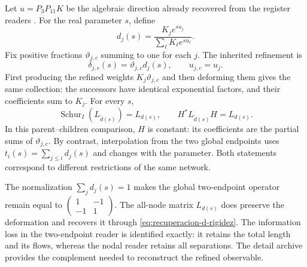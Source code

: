 Let \(u=P_3P_{11}K\) be the algebraic direction already recovered
from the register readers \cite{hmtX}. For the real parameter \(s\),
define
\[
 d_j(s)=\frac{K_je^{su_j}}{\sum_\ell K_\ell e^{su_\ell}}.
\]
Fix positive fractions \(\vartheta_{j,c}\) summing to one for each
\(j\). The inherited refinement is
\[
 \delta_{j,c}(s)=\vartheta_{j,c}d_j(s),\qquad
 u_{j,c}=u_j.
\]
First producing the refined weights \(K_j\vartheta_{j,c}\) and
then deforming them gives the same collection: the successors have identical
exponential factors, and their coefficients sum to \(K_j\).
For every \(s\),
\begin{equation}
 \operatorname{Schur}_{I}(L_{\widetilde d(s)})=L_{d(s)},
 \qquad H^*L_{\widetilde d(s)}H=L_{d(s)}.
 \label{eq:schur-flujo-k}
\end{equation}
In this parent--children comparison, \(H\) is constant: its
coefficients are the partial sums of \(\vartheta_{j,c}\).
By contrast, interpolation from the two global endpoints uses
\(t_i(s)=\sum_{j\le i}d_j(s)\) and changes with the parameter.
Both statements correspond to different restrictions of the same network.

The normalization \(\sum_jd_j(s)=1\) makes the global two-endpoint
operator remain equal to
\(\left(\begin{smallmatrix}1&-1\\-1&1\end{smallmatrix}\right)\).
The all-node matrix \(L_{d(s)}\) does preserve the deformation and
recovers it through \eqref{eq:recuperacion-d-rigidez}. The information
loss in the two-endpoint reader is identified exactly: it retains the
total length and its flows, whereas the nodal reader retains all
separations. The detail archive provides the complement needed to
reconstruct the refined observable.
